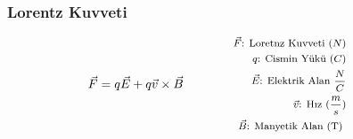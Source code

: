 \subsubsection*{Lorentz Kuvveti}
\begin{equation}
    \vec{F} = q \vec{E} + q \vec{v} \times \vec{B} \qquad \qquad \parbox{4cm}{\footnotesize$\begin{aligned}
        \vec{F}\text{: Loretnz Kuvveti } (N) \\
        q\text{: Cismin Yükü } (C) \\
        \vec{E}\text{: Elektrik Alan } \frac{N}{C} \\
        \vec{v}\text{: Hız } (\frac{m}{s}) \\
        \vec{B}\text{: Manyetik Alan (T) }
\end{aligned}$}
\end{equation}
